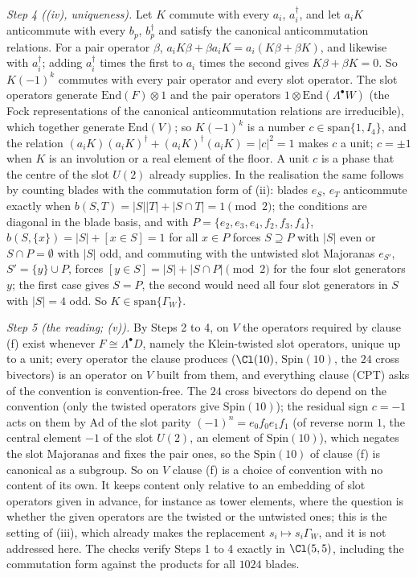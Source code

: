\emph{Step 4 ((iv), uniqueness).} Let $K$ commute with every $a_{i}$, $a_{i}^{\dagger}$, and let $a_{i}K$ anticommute with every $b_{p}$, $b_{p}^{\dagger}$ and satisfy the canonical anticommutation relations. For a pair operator $\beta$, $a_{i}K\beta + \beta a_{i}K = a_{i}(K\beta + \beta K)$, and likewise with $a_{i}^{\dagger}$; adding $a_{i}^{\dagger}$ times the first to $a_{i}$ times the second gives $K\beta + \beta K = 0$. So $K(-1)^{k}$ commutes with every pair operator and every slot operator. The slot operators generate $\mathrm{End}(F) \otimes 1$ and the pair operators $1 \otimes \mathrm{End}(\Lambda^{\bullet}W)$ (the Fock representations of the canonical anticommutation relations are irreducible), which together generate $\mathrm{End}(V)$; so $K(-1)^{k}$ is a number $c \in \mathrm{span}\{1, I_{4}\}$, and the relation $(a_{i}K)(a_{i}K)^{\dagger} + (a_{i}K)^{\dagger}(a_{i}K) = |c|^{2} = 1$ makes $c$ a unit; $c = \pm 1$ when $K$ is an involution or a real element of the floor. A unit $c$ is a phase that the centre of the slot $U(2)$ already supplies. In the realisation the same follows by counting blades with the commutation form of (ii): blades $e_{S}$, $e_{T}$ anticommute exactly when $b(S, T) = |S||T| + |S \cap T| = 1 \pmod 2$; the conditions are diagonal in the blade basis, and with $P = \{e_{2}, e_{3}, e_{4}, f_{2}, f_{3}, f_{4}\}$, $b(S, \{x\}) = |S| + [x \in S] = 1$ for all $x \in P$ forces $S \supseteq P$ with $|S|$ even or $S \cap P = \emptyset$ with $|S|$ odd, and commuting with the untwisted slot Majoranas $e_{S'}$, $S' = \{y\} \cup P$, forces $[y \in S] = |S| + |S \cap P| \pmod 2$ for the four slot generators $y$; the first case gives $S = P$, the second would need all four slot generators in $S$ with $|S| = 4$ odd. So $K \in \mathrm{span}\{\Gamma_{W}\}$.

\emph{Step 5 (the reading; (v)).} By Steps 2 to 4, on $V$ the operators required by clause (f) exist whenever $F \cong \Lambda^{\bullet}D$, namely the Klein-twisted slot operators, unique up to a unit; every operator the clause produces ($\Cl(10)$, $\mathrm{Spin}(10)$, the $24$ cross bivectors) is an operator on $V$ built from them, and everything clause (CPT) asks of the convention is convention-free. The $24$ cross bivectors do depend on the convention (only the twisted operators give $\mathrm{Spin}(10)$); the residual sign $c = -1$ acts on them by $\mathrm{Ad}$ of the slot parity $(-1)^{n} = e_{0}f_{0}e_{1}f_{1}$ (of reverse norm $1$, the central element $-1$ of the slot $U(2)$, an element of $\mathrm{Spin}(10)$), which negates the slot Majoranas and fixes the pair ones, so the $\mathrm{Spin}(10)$ of clause (f) is canonical as a subgroup. So on $V$ clause (f) is a choice of convention with no content of its own. It keeps content only relative to an embedding of slot operators given in advance, for instance as tower elements, where the question is whether the given operators are the twisted or the untwisted ones; this is the setting of (iii), which already makes the replacement $s_{i} \mapsto s_{i}\Gamma_{W}$, and it is not addressed here. The checks verify Steps 1 to 4 exactly in $\Cl(5,5)$, including the commutation form against the products for all $1024$ blades.
